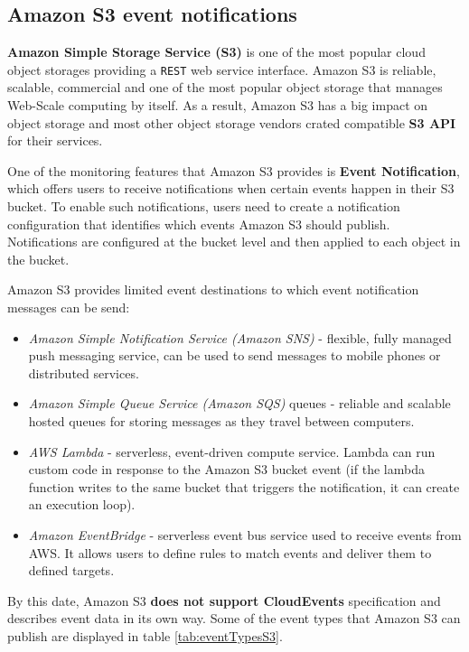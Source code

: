     \subsection{Amazon S3 event notifications}
    \textbf{Amazon Simple Storage Service (S3)} is one of the most popular cloud object storages providing a \texttt{REST} web service interface. Amazon S3 is reliable, scalable, commercial and one of the most popular object storage that manages Web-Scale computing by itself\cite{eventS3}. As a result, Amazon S3 has a big impact on object storage and most other object storage vendors crated compatible \textbf{S3 API} for their services.

    One of the monitoring features that Amazon S3 provides is \textbf{Event Notification}, which offers users to receive notifications when certain events happen in their S3 bucket. To enable such notifications, users need to create a notification configuration that identifies which events Amazon S3 should publish\cite{eventS3EventNotification}. Notifications are configured at the bucket level and then applied to each object in the bucket.

    Amazon S3 provides limited event destinations to which event notification messages can be send\cite{eventS3EventNotificationDest}:
    \begin{itemize}
        \item \textit{Amazon Simple Notification Service (Amazon SNS)} - flexible, fully managed push messaging service, can be used to send messages to mobile phones or distributed services.
        \item \textit{Amazon Simple Queue Service (Amazon SQS)} queues - reliable and scalable hosted queues for storing messages as they travel between computers.
        \item \textit{AWS Lambda} - serverless, event-driven compute service. Lambda can run custom code in response to the Amazon S3 bucket event (if the lambda function writes to the same bucket that triggers the notification, it can create an execution loop).
        \item \textit{Amazon EventBridge} - serverless event bus service used to receive events from AWS. It allows users to define rules to match events and deliver them to defined targets.
    \end{itemize}

    By this date, Amazon S3 \textbf{does not support CloudEvents} specification and describes event data in its own way. Some of the event types that Amazon S3 can publish are displayed in table \ref{tab:eventTypesS3}.


